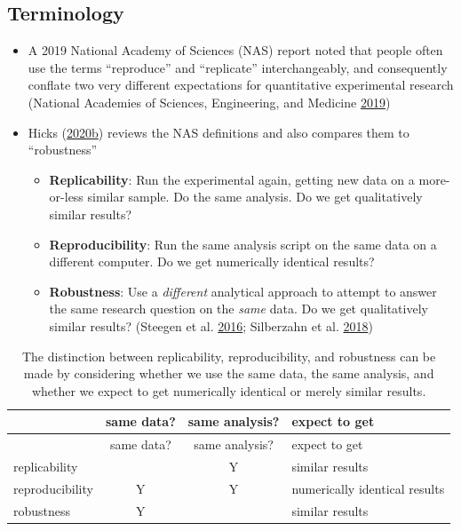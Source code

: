 \documentclass[
]{article}
\providecommand{\tightlist}{%
  \setlength{\itemsep}{0pt}\setlength{\parskip}{0pt}}
\begin{document}
\hypertarget{terminology}{%
\subsection{Terminology}\label{terminology}}

\begin{itemize}
\item
  A 2019 National Academy of Sciences (NAS) report noted that people often use the terms ``reproduce'' and ``replicate'' interchangeably, and consequently conflate two very different expectations for quantitative experimental research (National Academies of Sciences, Engineering, and Medicine \protect\hyperlink{ref-NationalAcademiesofSciencesEngineeringandMedicineReproducibilityReplicabilityScience2019}{2019})
\item
  Hicks (\protect\hyperlink{ref-HicksCommentSubmittedDaniel2020}{2020}\protect\hyperlink{ref-HicksCommentSubmittedDaniel2020}{b}) reviews the NAS definitions and also compares them to ``robustness''

  \begin{itemize}
  \tightlist
  \item
    \textbf{Replicability}: Run the experimental again, getting new data on a more-or-less similar sample. Do the same analysis. Do we get qualitatively similar results?\\
  \item
    \textbf{Reproducibility}: Run the same analysis script on the same data on a different computer. Do we get numerically identical results?
  \item
    \textbf{Robustness}: Use a \emph{different} analytical approach to attempt to answer the same research question on the \emph{same} data. Do we get qualitatively similar results? (Steegen et al. \protect\hyperlink{ref-SteegenIncreasingTransparencyMultiverse2016}{2016}; Silberzahn et al. \protect\hyperlink{ref-SilberzahnManyAnalystsOne2018}{2018})
  \end{itemize}
\end{itemize}

\begin{longtable}[]{@{}lccl@{}}
\caption{The distinction between replicability, reproducibility, and robustness can be made by considering whether we use the same data, the same analysis, and whether we expect to get numerically identical or merely similar results.}\tabularnewline
\toprule
& same data? & same analysis? & expect to get\tabularnewline
\midrule
\endfirsthead
\toprule
& same data? & same analysis? & expect to get\tabularnewline
\midrule
\endhead
replicability & & Y & similar results\tabularnewline
reproducibility & Y & Y & numerically identical results\tabularnewline
robustness & Y & & similar results\tabularnewline
\bottomrule
\end{longtable}
\end{document}
